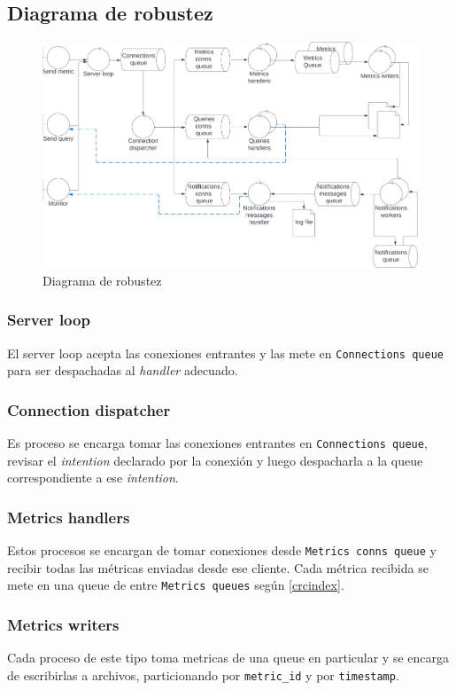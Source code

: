 \documentclass[a4paper,oneside]{article}
\begin{document}
\subsection{Diagrama de robustez} \label{robustez}
\begin{figure}[H]
\centering
\includegraphics[width=\textwidth]{images/diagrama_robustez.png}
\caption{Diagrama de robustez}
\end{figure}

\subsubsection{Server loop}
El server loop acepta las conexiones entrantes y las mete en \texttt{Connections queue} para ser despachadas al \textit{handler} adecuado.

\subsubsection{Connection dispatcher}
Es proceso se encarga tomar las conexiones entrantes en \texttt{Connections queue}, revisar el \textit{intention} declarado por la conexión y luego despacharla a la queue correspondiente a ese \textit{intention}.

\subsubsection{Metrics handlers}
Estos procesos se encargan de tomar conexiones desde \texttt{Metrics conns queue} y recibir todas las métricas enviadas desde ese cliente. Cada métrica recibida se mete en una queue de entre \texttt{Metrics queues} según \eqref{crcindex}.

\subsubsection{Metrics writers}
Cada proceso de este tipo toma metricas de una queue en particular y se encarga de escribirlas a archivos, particionando por \texttt{metric\_id} y por \texttt{timestamp}.
\end{document}
